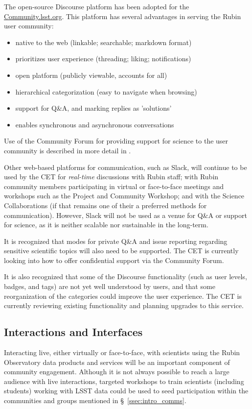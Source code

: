 \documentclass[DM,lsstdraft,toc]{lsstdoc}
\begin{document}
The open-source Discourse platform has been adopted for the \url{Community.lsst.org}.
This platform has several advantages in serving the Rubin user community:
\begin{itemize}
\item native to the web (linkable; searchable; markdown format)
\item prioritizes user experience (threading; liking; notifications)
\item open platform (publicly viewable, accounts for all)
\item hierarchical categorization (easy to navigate when browsing)
\item support for Q\&A, and marking replies as 'solutions'
\item enables synchronous and asynchronous conversations
\end{itemize}

Use of the Community Forum for providing support for science to the user community is described in more detail in .

Other web-based platforms for communication, such as Slack, will continue to be used by the CET for \textit{real-time} discussions with Rubin staff; with Rubin community members participating in virtual or face-to-face meetings and workshops such as the Project and Community Workshop; and with the Science Collaborations (if that remains one of their a preferred methods for communication).
However, Slack will not be used as a venue for Q\&A or support for science, as it is neither scalable nor sustainable in the long-term.

It is recognized that modes for private Q\&A and issue reporting regarding sensitive scientific topics will also need to be supported.
The CET is currently looking into how to offer confidential support via the Community Forum.

It is also recognized that some of the Discourse functionality (such as user levels, badges, and tags) are not yet well understood by users, and that some reorganization of the categories could improve the user experience.
The CET is currently reviewing existing functionality and planning upgrades to this service.


\subsection{Interactions and Interfaces}\label{ssec:mod_interface}

Interacting live, either virtually or face-to-face, with scientists using the Rubin Observatory data products and services will be an important component of community engagement.
Although it is not always possible to reach a large audience with live interactions, targeted workshops to train scientists (including students) working with LSST data could be used to seed participation within the communities and groups mentioned in \S~\ref{ssec:intro_comms}.
\end{document}
